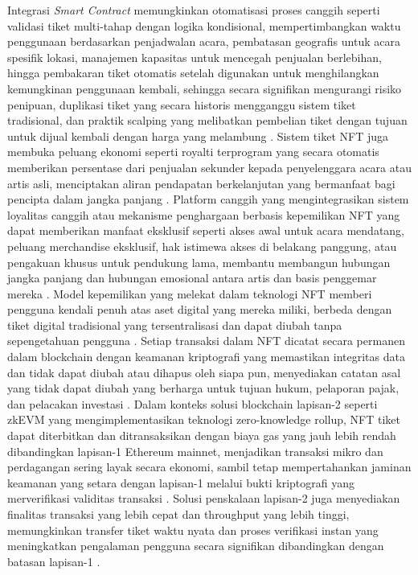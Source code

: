 Integrasi \emph{Smart Contract} memungkinkan otomatisasi proses canggih seperti validasi tiket multi-tahap dengan logika kondisional, mempertimbangkan waktu penggunaan berdasarkan penjadwalan acara, pembatasan geografis untuk acara spesifik lokasi, manajemen kapasitas untuk mencegah penjualan berlebihan, hingga pembakaran tiket otomatis setelah digunakan untuk menghilangkan kemungkinan penggunaan kembali, sehingga secara signifikan mengurangi risiko penipuan, duplikasi tiket yang secara historis mengganggu sistem tiket tradisional, dan praktik scalping yang melibatkan pembelian tiket dengan tujuan untuk dijual kembali dengan harga yang melambung \parencite{Valeonti2021}.
Sistem tiket NFT juga membuka peluang ekonomi seperti royalti terprogram yang secara otomatis memberikan persentase dari penjualan sekunder kepada penyelenggara acara atau artis asli, menciptakan aliran pendapatan berkelanjutan yang bermanfaat bagi pencipta dalam jangka panjang \parencite{Kugler2021}. Platform canggih yang mengintegrasikan sistem loyalitas canggih atau mekanisme penghargaan berbasis kepemilikan NFT yang dapat memberikan manfaat eksklusif seperti akses awal untuk acara mendatang, peluang merchandise eksklusif, hak istimewa akses di belakang panggung, atau pengakuan khusus untuk pendukung lama, membantu membangun hubungan jangka panjang dan hubungan emosional antara artis dan basis penggemar mereka \parencite{Frye2022}.
Model kepemilikan yang melekat dalam teknologi NFT memberi pengguna kendali penuh atas aset digital yang mereka miliki, berbeda dengan tiket digital tradisional yang tersentralisasi dan dapat diubah tanpa sepengetahuan pengguna \parencite{Chalmers2022}. Setiap transaksi dalam NFT dicatat secara permanen dalam blockchain dengan keamanan kriptografi yang memastikan integritas data dan tidak dapat diubah atau dihapus oleh siapa pun, menyediakan catatan asal yang tidak dapat diubah yang berharga untuk tujuan hukum, pelaporan pajak, dan pelacakan investasi \parencite{Ante2022}.
Dalam konteks solusi blockchain lapisan-2 seperti zkEVM yang mengimplementasikan teknologi zero-knowledge rollup, NFT tiket dapat diterbitkan dan ditransaksikan dengan biaya gas yang jauh lebih rendah dibandingkan lapisan-1 Ethereum mainnet, menjadikan transaksi mikro dan perdagangan sering layak secara ekonomi, sambil tetap mempertahankan jaminan keamanan yang setara dengan lapisan-1 melalui bukti kriptografi yang merverifikasi validitas transaksi \parencite{Buterin2021}. Solusi penskalaan lapisan-2 juga menyediakan finalitas transaksi yang lebih cepat dan throughput yang lebih tinggi, memungkinkan transfer tiket waktu nyata dan proses verifikasi instan yang meningkatkan pengalaman pengguna secara signifikan dibandingkan dengan batasan lapisan-1 \parencite{Gudgeon2020}.
